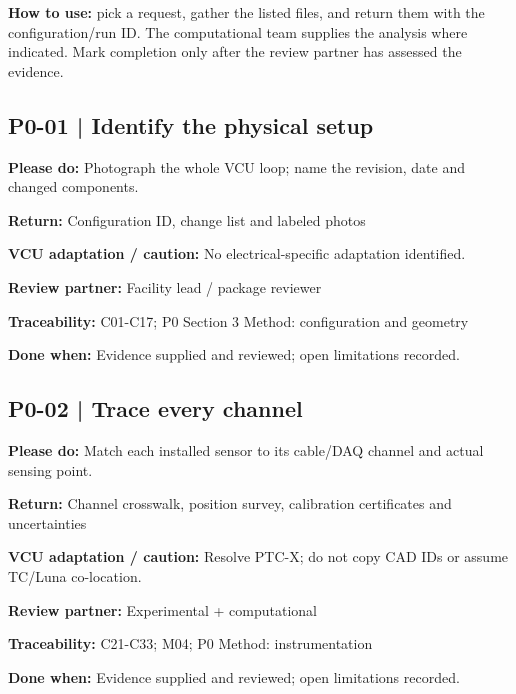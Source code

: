 \documentclass[11pt]{article}
\begin{document}
\textbf{How to use:} pick a request, gather the listed files, and return them with the configuration/run ID. The computational team supplies the analysis where indicated. Mark completion only after the review partner has assessed the evidence.
\par\noindent\begin{minipage}{\textwidth}\small\setlength{\parskip}{2pt}
\subsection*{P0-01 | Identify the physical setup}
\textbf{Please do:} Photograph the whole VCU loop; name the revision, date and changed components.\par
\textbf{Return:} Configuration ID, change list and labeled photos\par
\textbf{VCU adaptation / caution:} No electrical-specific adaptation identified.\par
\textbf{Review partner:} Facility lead / package reviewer\par
\textbf{Traceability:} C01-C17; P0 Section 3 Method: configuration and geometry\par
\textbf{Done when:} Evidence supplied and reviewed; open limitations recorded.\par
\end{minipage}\par\vspace{8pt}
\par\noindent\begin{minipage}{\textwidth}\small\setlength{\parskip}{2pt}
\subsection*{P0-02 | Trace every channel}
\textbf{Please do:} Match each installed sensor to its cable/DAQ channel and actual sensing point.\par
\textbf{Return:} Channel crosswalk, position survey, calibration certificates and uncertainties\par
\textbf{VCU adaptation / caution:} Resolve PTC-X; do not copy CAD IDs or assume TC/Luna co-location.\par
\textbf{Review partner:} Experimental + computational\par
\textbf{Traceability:} C21-C33; M04; P0 Method: instrumentation\par
\textbf{Done when:} Evidence supplied and reviewed; open limitations recorded.\par
\end{minipage}\par\vspace{8pt}
\end{document}
